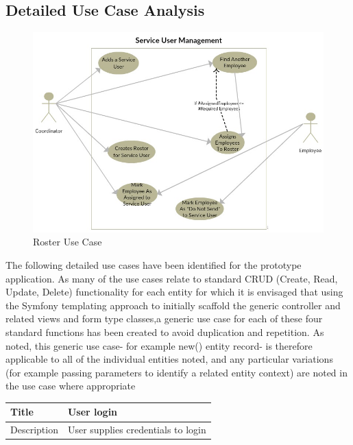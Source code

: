\documentclass[a4paper,12pt]{article}
\newcommand\addheading[2]{#1 &#2\\ \hline}
\newcommand\tabularhead{\begin{tabular}{lp{8cm}}
\hline
}
\newenvironment{usecase}{\tabularhead}
{\hline\end{tabular}}
\begin{document}
\begin{samepage}
\subsection {Detailed Use Case Analysis}
 \begin{figure}[h!]
  \includegraphics[scale=0.8]{rosterusecase.jpg}
  \caption{Roster Use Case}
  \label{fig:roster use case}
\end{figure}
The following detailed use cases have been identified for the prototype application. As many of the use cases relate to standard CRUD (Create, Read, Update, Delete) functionality for each entity for which it is envisaged that using the Symfony templating approach to initially scaffold the generic controller and related views and form type classes,a generic use case for each of these four standard functions has been created to avoid duplication and repetition. As noted, this generic use case- for example new() entity record- is therefore applicable to all of the individual entities noted, and any particular variations (for example passing parameters to identify a related entity context) are noted in the use case where appropriate
\begin{usecase}
    \addheading{Title}{User login}
  \addheading{Description}{User supplies credentials to login}
  

\end{usecase}
\end{samepage}
\end{document}
